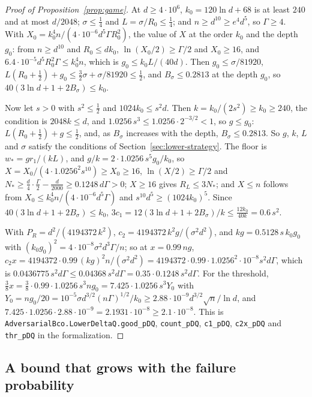 \documentclass[11pt]{amsart}
\theoremstyle{definition}
\numberwithin{equation}{section}
\begin{document}
\begin{proof}[Proof of Proposition~\ref{prop:game}]
At $d\ge4\cdot10^6$, $k_0=120\ln d+68$ is at least $240$ and at most $d/2048$; $\sigma\le\frac14$ and $L=\sigma/R_0\le\frac14$; and $n\ge d^{10}\ge e^4d^5$, so $\Gamma\ge4$. With $X_0=k_0^4n/(4\cdot10^{-6}d^5\Gamma R_0^2)$, the value of $X$ at the order $k_0$ and the depth $g_0$: from $n\ge d^{10}$ and $R_0\le dk_0$, $\ln(X_0/2)\ge\Gamma/2$ and $X_0\ge16$, and $6.4\cdot10^{-5}d^5R_0^2\Gamma\le k_0^4n$, which is $g_0\le k_0L/(40d)$. Then $g_0\le\sigma/81920$, $L(R_0+\frac12)+g_0\le\frac32\sigma+\sigma/81920\le\frac12$, and $B_\sigma\le0.2813$ at the depth $g_0$, so $40(3\ln d+1+2B_\sigma)\le k_0$.

Now let $s>0$ with $s^2\le\frac12$ and $1024k_0\le s^2d$. Then $k=k_0/(2s^2)\ge k_0\ge240$, the condition is $2048k\le d$, and $1.0256\,s^3\le1.0256\cdot2^{-3/2}<1$, so $g\le g_0$: $L(R_0+\frac12)+g\le\frac12$, and, as $B_\sigma$ increases with the depth, $B_\sigma\le0.2813$. So $g$, $k$, $L$ and $\sigma$ satisfy the conditions of Section~\ref{sec:lower-strategy}. The floor is $w_*=gr_1/(kL)$, and $g/k=2\cdot1.0256\,s^5g_0/k_0$, so $X=X_0/(4\cdot1.0256^2s^{10})\ge X_0\ge16$, $\ln(X/2)\ge\Gamma/2$ and $N_*\ge\frac d4\cdot\frac\Gamma2-\frac d{2000}\ge0.1248\,d\Gamma>0$; $X\ge16$ gives $R_L\le3N_*$; and $X\le n$ follows from $X_0\le k_0^4n/(4\cdot10^{-6}d^5\Gamma)$ and $s^{10}d^5\ge(1024k_0)^5$. Since $40(3\ln d+1+2B_\sigma)\le k_0$, $3c_1=12(3\ln d+1+2B_\sigma)/k\le\frac{12k_0}{40k}=0.6\,s^2$.

With $P_R=d^2/(4194372\,k^2)$, $c_2=4194372\,k^2g/(\sigma^2d^2)$, and $kg=0.5128\,s\,k_0g_0$ with $(k_0g_0)^2=4\cdot10^{-8}\sigma^2d^3\Gamma/n$; so at $x=0.99\,ng$, $c_2x=4194372\cdot0.99\,(kg)^2n/(\sigma^2d^2)=4194372\cdot0.99\cdot1.0256^2\cdot10^{-8}s^2d\Gamma$, which is $0.0436775\,s^2d\Gamma\le0.04368\,s^2d\Gamma=0.35\cdot0.1248\,s^2d\Gamma$. For the threshold, $\frac38x=\frac38\cdot0.99\cdot1.0256\,s^3ng_0=7.425\cdot1.0256\,s^3Y_0$ with $Y_0=ng_0/20=10^{-5}\sigma d^{3/2}(n\Gamma)^{1/2}/k_0\ge2.88\cdot10^{-9}d^{3/2}\sqrt n/\ln d$, and $7.425\cdot1.0256\cdot2.88\cdot10^{-9}=2.1931\cdot10^{-8}\ge2.1\cdot10^{-8}$.
This is \texttt{AdversarialBco.\allowbreak LowerDeltaQ.\allowbreak good\_pDQ}, \texttt{count\_pDQ}, \texttt{c1\_pDQ}, \texttt{c2x\_pDQ} and \texttt{thr\_pDQ} in the formalization.
\end{proof}

\subsection*{A bound that grows with the failure probability}
\end{document}
